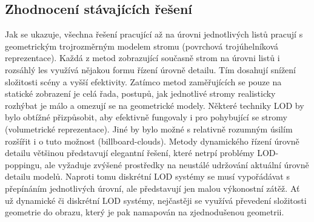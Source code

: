 \subsection{Zhodnocení stávajících řešení}
Jak se ukazuje, všechna řešení pracující až na úrovni jednotlivých listů pracují s geometrickým trojrozměrným modelem stromu (povrchová trojúhelníková reprezentace). Každá z metod zobrazující současně strom na úrovni listů i rozsáhlý les využívá nějakou formu řízení úrovně detailu. Tím dosahují snížení složitosti scény a vyšší efektivity. Zatímco metod zaměřujících se pouze na statické zobrazení je celá řada, postupů, jak jednotlivé stromy realisticky rozhýbat je málo a omezují se na geometrické modely. Některé techniky LOD by bylo obtížné přizpůsobit, aby efektivně fungovaly i pro pohybující se stromy (volumetrické reprezentace). Jiné by bylo možné s relativně rozumným úsilím rozšířit i o tuto možnost (billboard-clouds). Metody dynamického řízení úrovně detailu většinou představují elegantní řešení, které netrpí problémy LOD-poppingu, ale vyžaduje zvýšené prostředky na neustálé udržování aktuální úrovně detailu modelů. Naproti tomu diskrétní LOD systémy se musí vypořádávat s přepínáním jednotlivých úrovní, ale představují jen malou výkonostní zátěž. Ať už dynamické či diskrétní LOD systémy, nejčastěji se využívá převedení složitosti geometrie do obrazu, který je pak namapován na zjednodušenou geometrii.

